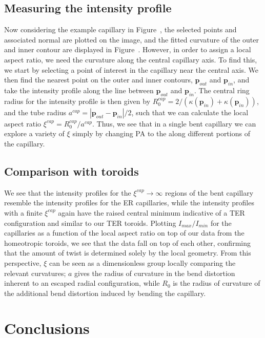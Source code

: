 \subsection{Measuring the intensity profile}
Now considering the example capillary in Figure~, the selected points and associated normal are plotted on the image, and the fitted curvature of the outer and inner contour are displayed in Figure~.
However, in order to assign a local aspect ratio, we need the curvature along the central capillary axis.
To find this, we start by selecting a point of interest in the capillary near the central axis.
We then find the nearest point on the outer and inner contours, $\mathbf{p}_{out}$ and $\mathbf{p}_{in}$, and take the intensity profile along the line between $\mathbf{p}_{out}$ and $\mathbf{p}_{in}$.
The central ring radius for the intensity profile is then given by $R^{cap}_0 = 2/(\kappa(\mathbf{p}_{in}) + \kappa(\mathbf{p}_{in}))$, and the tube radius $a^{cap} = |\mathbf{p}_{out} - \mathbf{p}_{in}|/2$, such that we can calculate the local aspect ratio $\xi^{cap} = R^{cap}_0/a^{cap}$.
Thus, we see that in a single bent capillary we can explore a variety of $\xi$ simply by changing PA to the along different portions of the capillary.


\subsection{Comparison with toroids}
We see that the intensity profiles for the $\xi^{cap} \rightarrow \infty$ regions of the bent capillary resemble the intensity profiles for the ER capillaries, while the intensity profiles with a finite $\xi^{cap}$ again have the raised central minimum indicative of a TER configuration and similar to our TER toroids.
Plotting $I_{max}/I_{min}$ for the capillaries as a function of the local aspect ratio on top of our data from the homeotropic toroids, we see that the data fall on top of each other, confirming that the amount of twist is determined solely by the local geometry.
From this perspective, $\xi$ can be seen as a dimensionless group locally comparing the relevant curvatures; $a$ gives the radius of curvature in the bend distortion inherent to an escaped radial configuration, while $R_0$ is the radius of curvature of the additional bend distortion induced by bending the capillary.


\section{Conclusions}
